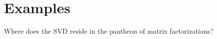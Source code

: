 \chapter{Examples}

Where does the SVD reside in the pantheon of matrix factorizations?

%
%


\endinput